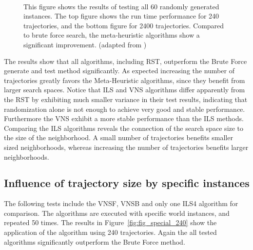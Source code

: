 \begin{figure}[thb]
   \myfloatalign
    \tiny
    \centering
    \\
    \caption[Experiment: All instances]{This figure shows the results of testing all 60 randomly generated instances. The top figure shows the run time performance for 240 trajectories, and the bottom figure for 2400 trajectories. Compared to brute force search, the meta-heuristic algorithms show a significant improvement. (adapted from \cite{myself})}
      \label{fig:fig_allworlds}
   \end{figure}

The results show that all algorithms, including RST, outperform the Brute Force generate and test method significantly. 
As expected increasing the number of trajectories greatly favors the Meta-Heuristic algorithms, since they benefit from larger search spaces. 
Notice that ILS and VNS algorithms differ apparently from the RST by exhibiting much smaller variance in their test results, indicating that randomization alone is not enough to achieve very good and stable performance.
Furthermore the VNS exhibit a more stable performance than the ILS methods. 
Comparing the ILS algorithms reveals the connection of the search space size to the size of the neighborhood. 
A small number of trajectories benefits smaller sized neighborhoods, whereas increasing the number of trajectories benefits larger neighborhoods. 

\subsection{Influence of trajectory size by specific instances}
The following tests include the VNSF, VNSB and only one ILS4 algorithm for comparison. 
The algorithms are executed with specific world instances, and repeated 50 times. 
The results in Figure~\ref{fig:fig_special_240} show the application of the algorithm using 240 trajectories. Again the all tested algorithms significantly outperform the Brute Force method. 

